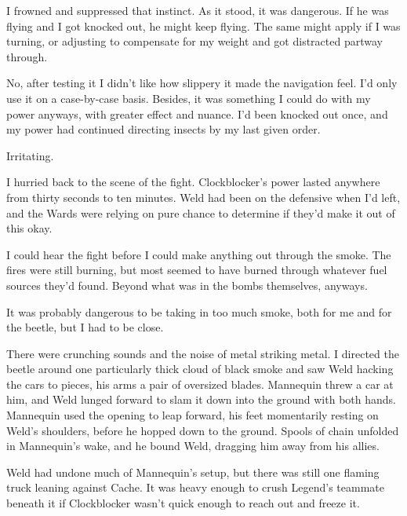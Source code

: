I frowned and suppressed that instinct.  As it stood, it was dangerous.  If he was flying and I got knocked out, he might keep flying.  The same might apply if I was turning, or adjusting to compensate for my weight and got distracted partway through.



No, after testing it I didn't like how slippery it made the navigation feel.  I'd only use it on a case-by-case basis.  Besides, it was something I could do with my power anyways, with greater effect and nuance.  I'd been knocked out once, and my power had continued directing insects by my last given order.



Irritating.



I hurried back to the scene of the fight.  Clockblocker's power lasted anywhere from thirty seconds to ten minutes.  Weld had been on the defensive when I'd left, and the Wards were relying on pure chance to determine if they'd make it out of this okay.



I could hear the fight before I could make anything out through the smoke.  The fires were still burning, but most seemed to have burned through whatever fuel sources they'd found. Beyond what was in the bombs themselves, anyways.



It was probably dangerous to be taking in too much smoke, both for me and for the beetle, but I had to be close.



There were crunching sounds and the noise of metal striking metal.  I directed the beetle around one particularly thick cloud of black smoke and saw Weld hacking the cars to pieces, his arms a pair of oversized blades.  Mannequin threw a car at him, and Weld lunged forward to slam it down into the ground with both hands.  Mannequin used the opening to leap forward, his feet momentarily resting on Weld's shoulders, before he hopped down to the ground.  Spools of chain unfolded in Mannequin's wake, and he bound Weld, dragging him away from his allies.



Weld had undone much of Mannequin's setup, but there was still one flaming truck leaning against Cache.  It was heavy enough to crush Legend's teammate beneath it if Clockblocker wasn't quick enough to reach out and freeze it.



